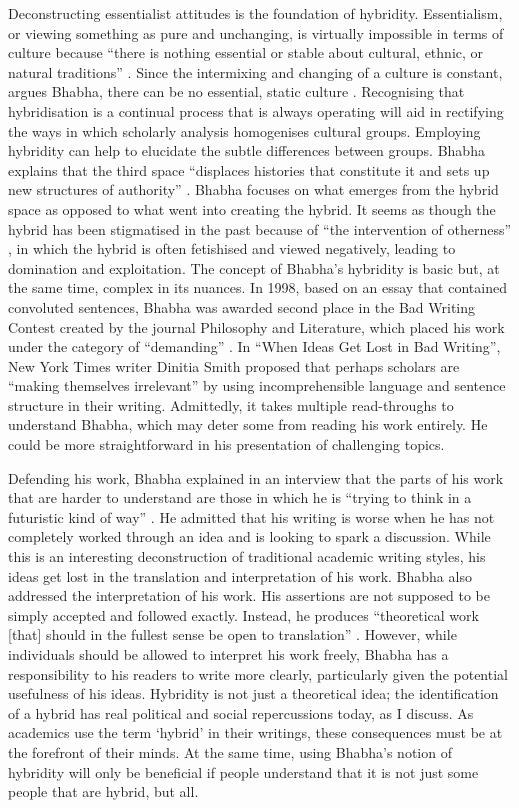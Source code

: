 	Deconstructing essentialist attitudes is the foundation of hybridity. Essentialism, or viewing something as pure and unchanging, is virtually impossible in terms of culture because “there is nothing essential or stable about cultural, ethnic, or natural traditions” \parencite[5]{VossAllen_2008}. Since the intermixing and changing of a culture is constant, argues Bhabha, there can be no essential, static culture \parencite[52]{Bhabha_1994}. Recognising that hybridisation is a continual process that is always operating will aid in rectifying the ways in which scholarly analysis homogenises cultural groups. Employing hybridity can help to elucidate the subtle differences between groups. Bhabha explains that the third space “displaces histories that constitute it and sets up new structures of authority” \parencite[211]{Rutherford_1990}. Bhabha focuses on what emerges from the hybrid space as opposed to what went into creating the hybrid. It seems as though the hybrid has been stigmatised in the past because of “the intervention of otherness” \parencite[211]{Rutherford_1990}, in which the hybrid is often fetishised and viewed negatively, leading to domination and exploitation.
	The concept of Bhabha’s hybridity is basic but, at the same time, complex in its nuances. In 1998, based on an essay that contained convoluted sentences, Bhabha was awarded second place in the Bad Writing Contest created by the journal Philosophy and Literature, which placed his work under the category of “demanding” \parencite{Smith_1999}. In “When Ideas Get Lost in Bad Writing”, New York Times writer Dinitia Smith proposed that perhaps scholars are “making themselves irrelevant” by using incomprehensible language and sentence structure in their writing.  Admittedly, it takes multiple read-throughs to understand Bhabha, which may deter some from reading his work entirely. He could be more straightforward in his presentation of challenging topics. 
	
	Defending his work, Bhabha explained in an interview that the parts of his work that are harder to understand are those in which he is “trying to think in a futuristic kind of way” \parencite[82]{Mitchell_1995}. He admitted that his writing is worse when he has not completely worked through an idea and is looking to spark a discussion. While this is an interesting deconstruction of traditional academic writing styles, his ideas get lost in the translation and interpretation of his work. 
	Bhabha also addressed the interpretation of his work. His assertions are not supposed to be simply accepted and followed exactly.  Instead, he produces “theoretical work [that] should in the fullest sense be open to translation” \parencite[82]{Mitchell_1995}. However, while individuals should be allowed to interpret his work freely, Bhabha has a responsibility to his readers to write more clearly, particularly given the potential usefulness of his ideas. Hybridity is not just a theoretical idea; the identification of a hybrid has real political and social repercussions today, as I discuss. As academics use the term ‘hybrid’ in their writings, these consequences must be at the forefront of their minds. At the same time, using Bhabha’s notion of hybridity will only be beneficial if people understand that it is not just some people that are hybrid, but all. 
	
